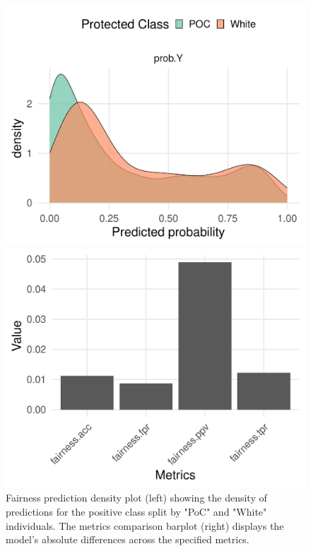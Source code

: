 \begin{figure}[htbp]
    \centering
    \begin{minipage}{0.49\textwidth}
        \centering
        \includegraphics[width=\textwidth]{../figures/sqf_case_study_plot1.pdf}
    \end{minipage}
    \hfill
    \begin{minipage}{0.49\textwidth}
        \centering
        \includegraphics[width=\textwidth]{../figures/sqf_case_study_plot2.pdf}
    \end{minipage}
    \caption{Fairness prediction density plot (left) showing the density of predictions for the positive class split by "PoC" and "White" individuals. The metrics comparison barplot (right) displays the model's absolute differences across the specified metrics.}
    \label{fig:fairness_density}
\end{figure}


